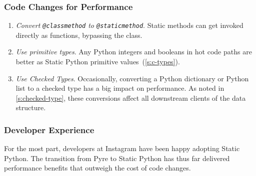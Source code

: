 \documentclass[english,cleveref,submission]{programming}
\newcommand{\SP}{Static Python}
\newcommand{\code}[1]{\texttt{#1}}
\newcommand{\ipara}[1]{\emph{#1}\/.}
\begin{document}
\subsubsection{Code Changes for Performance}

\begin{enumerate}
  \item
    \ipara{Convert \code{@classmethod} to \code{@staticmethod}}
    Static methods can get invoked directly as functions, bypassing the class.



  \item
    \ipara{Use primitive types}
    Any Python integers and booleans in hot code paths are better as
    \SP{} primitive values~(\cref{s:c-types}).

  \item
    \ipara{Use Checked Types}
    Occasionally, converting a Python dictionary or Python list to a
    checked type has a big impact on performance.
    As noted in \cref{s:checked-type}, these conversions affect all downstream
    clients of the data structure.

\end{enumerate}


\subsubsection{Developer Experience}

For the most part, developers at Instagram have been happy adopting \SP{}.
The transition from Pyre to \SP{} has thus far delivered performance benefits
that outweigh the cost of code changes.
\end{document}

